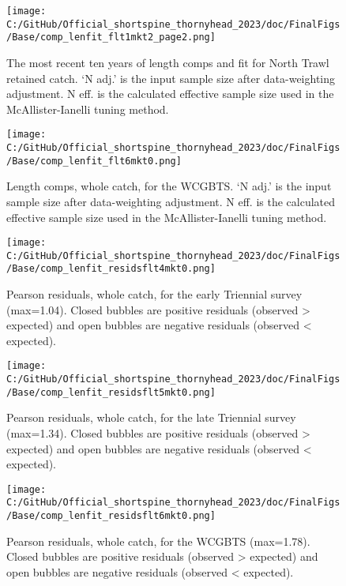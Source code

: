 \documentclass[11pt,
  english,
  letterpaper,
]{article}
\begin{document}
\begin{figure}
\centering
\texttt{[image: C:/GitHub/Official\_shortspine\_thornyhead\_2023/doc/FinalFigs/Base/comp\_lenfit\_flt1mkt2\_page2.png]}
\caption{The most recent ten years of length comps and fit for North Trawl retained catch. `N adj.' is the input sample size after data-weighting adjustment. N eff. is the calculated effective sample size used in the McAllister-Ianelli tuning method.\label{fig:ntrawl_comps_ten}}
\end{figure}

\begin{figure}
\centering
\texttt{[image: C:/GitHub/Official\_shortspine\_thornyhead\_2023/doc/FinalFigs/Base/comp\_lenfit\_flt6mkt0.png]}
\caption{Length comps, whole catch, for the WCGBTS. `N adj.' is the input sample size after data-weighting adjustment. N eff. is the calculated effective sample size used in the McAllister-Ianelli tuning method.\label{fig:fits_wcgbts}}
\end{figure}

\begin{figure}
\centering
\texttt{[image: C:/GitHub/Official\_shortspine\_thornyhead\_2023/doc/FinalFigs/Base/comp\_lenfit\_residsflt4mkt0.png]}
\caption{Pearson residuals, whole catch, for the early Triennial survey (max=1.04). Closed bubbles are positive residuals (observed \textgreater{} expected) and open bubbles are negative residuals (observed \textless{} expected).\label{fig:resids_tri1}}
\end{figure}

\begin{figure}
\centering
\texttt{[image: C:/GitHub/Official\_shortspine\_thornyhead\_2023/doc/FinalFigs/Base/comp\_lenfit\_residsflt5mkt0.png]}
\caption{Pearson residuals, whole catch, for the late Triennial survey (max=1.34). Closed bubbles are positive residuals (observed \textgreater{} expected) and open bubbles are negative residuals (observed \textless{} expected).\label{fig:resids_tri2}}
\end{figure}

\begin{figure}
\centering
\texttt{[image: C:/GitHub/Official\_shortspine\_thornyhead\_2023/doc/FinalFigs/Base/comp\_lenfit\_residsflt6mkt0.png]}
\caption{Pearson residuals, whole catch, for the WCGBTS (max=1.78). Closed bubbles are positive residuals (observed \textgreater{} expected) and open bubbles are negative residuals (observed \textless{} expected).\label{fig:resids_wcgbts}}
\end{figure}
\end{document}
